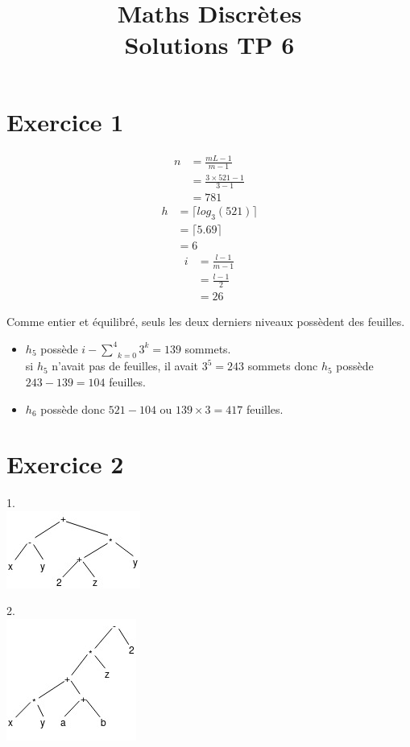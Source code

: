 \documentclass[fontsize=10pt]{article}
\title{\textbf{Maths Discrètes}\\ Solutions TP 6}
\date{}
\begin{document}
\maketitle %


\section*{Exercice 1}
\begin{align*}
n &= \frac{mL -1}{m-1}\\
&= \frac{3\times 521 -1}{3-1}\\
&= 781
\end{align*}
\begin{align*}
h &= \lceil log_3(521) \rceil\\
&= \lceil 5.69 \rceil\\
&= 6
\end{align*}
\begin{align*}
i &= \frac{l -1}{m-1}\\
&= \frac{l-1}{2}\\
&= 26
\end{align*}

Comme entier et équilibré, seuls les deux derniers niveaux possèdent des feuilles.
\begin{itemize}
\item $h_5$ possède $i - \underset{k=0}{\overset{4}{\sum}}3^k = 139$ sommets.\\
si $h_5$ n'avait pas de feuilles, il avait $3^5 = 243$ sommets donc $h_5$ possède $243-139 =104$ feuilles.
\item $h_6$ possède donc $521-104$ ou $139 \times 3 = 417$ feuilles.
\end{itemize}


\section*{Exercice 2}


1.\\ \includegraphics[scale=1]{TP6Exo2_1.jpg} 


\hspace{-0.58cm}2.\\ \includegraphics[scale=1]{TP6Exo2_2.jpg} 
\end{document}
